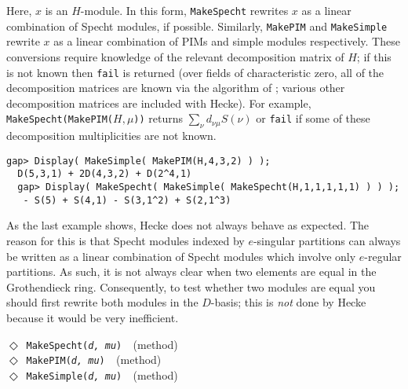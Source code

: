 \documentclass[a4paper,11pt]{report}
\begin{document}
{{{ Here, $x$ is an $H$-module. In this form, \texttt{MakeSpecht} rewrites $x$ as a linear combination of Specht modules, if possible. Similarly, \texttt{MakePIM} and \texttt{MakeSimple} rewrite $x$ as a linear combination of PIMs and simple modules respectively. These
conversions require knowledge of the relevant decomposition matrix of $H$; if this is not known then \texttt{fail} is returned (over fields of characteristic zero, all of the decomposition
matrices are known via the algorithm of \cite{LLT}; various other decomposition matrices are included with \textsf{Hecke}). For example, \texttt{MakeSpecht(MakePIM(}$H, \mu$\texttt{))} returns $\sum_\nu d_{\nu\mu} S(\nu)$ or \texttt{fail} if some of these decomposition multiplicities are not known. 
\begin{Verbatim}[fontsize=\small,frame=single,label=Example]
  gap> Display( MakeSimple( MakePIM(H,4,3,2) ) );
  D(5,3,1) + 2D(4,3,2) + D(2^4,1)
  gap> Display( MakeSpecht( MakeSimple( MakeSpecht(H,1,1,1,1,1) ) ) );
   - S(5) + S(4,1) - S(3,1^2) + S(2,1^3)
\end{Verbatim}
 As the last example shows, \textsf{Hecke} does not always behave as expected. The reason for this is that Specht modules
indexed by $e$-singular partitions can always be written as a linear combination of Specht
modules which involve only $e$-regular partitions. As such, it is not always clear when two elements are
equal in the Grothendieck ring. Consequently, to test whether two modules are
equal you should first rewrite both modules in the $D$-basis; this is \emph{not} done by \textsf{Hecke} because it would be very inefficient.

 \noindent\textcolor{FuncColor}{$\Diamond$\ \texttt{MakeSpecht({\slshape d, mu})
\label{MakeSpecht:for a decomposition matrix}
}\hfill{\scriptsize (method)}}\\
\noindent\textcolor{FuncColor}{$\Diamond$\ \texttt{MakePIM({\slshape d, mu})
\label{MakePIM:for a decomposition matrix}
}\hfill{\scriptsize (method)}}\\
\noindent\textcolor{FuncColor}{$\Diamond$\ \texttt{MakeSimple({\slshape d, mu})
\label{MakeSimple:for a decomposition matrix}
}\hfill{\scriptsize (method)}}\\


}}}
\end{document}

